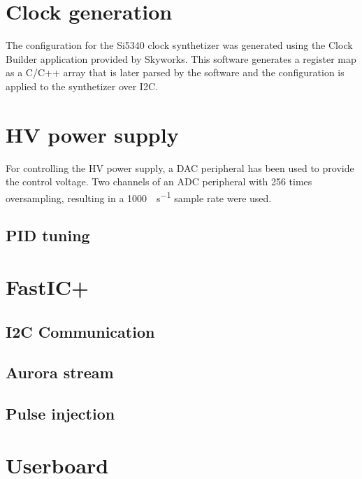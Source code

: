 \section{Clock generation}
The configuration for the Si5340 clock synthetizer was generated using the Clock Builder application provided by Skyworks. This software generates a register map as a C/C++ array that is later parsed by the software and the configuration is applied to the synthetizer over I2C.

\section{HV power supply}
For controlling the HV power supply, a DAC peripheral has been used to provide the control voltage. Two channels of an ADC peripheral with 256 times oversampling, resulting in a \SI{1000}{\sample\per\second} sample rate were used. 
\subsection{PID tuning}

\section{FastIC+}
\subsection{I2C Communication}
\subsection{Aurora stream}
\subsection{Pulse injection}

\section{Userboard}
